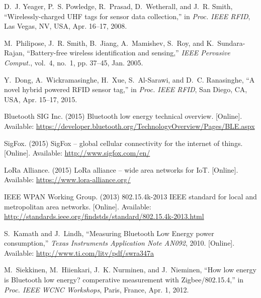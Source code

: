 \documentclass[conference,letterpaper,twoside,final,10pt]{IEEEtran}
\begin{document}
\begin{thebibliography}{10}
D.~J. {Yeager}, P.~S. {Powledge}, R.~{Prasad}, D.~{Wetherall}, and J.~R. Smith,
  ``Wirelessly-charged {UHF} tags for sensor data collection,'' in \emph{Proc.
  {IEEE} {RFID}}, Las Vegas, NV, USA, Apr. 16--17, 2008.

M.~{Philipose}, J.~R. {Smith}, B.~{Jiang}, A.~{Mamishev}, S.~{Roy}, and
  K.~{Sundara-Rajan}, ``Battery-free wireless identification and sensing,''
  \emph{{IEEE} Pervasive Comput.}, vol.~4, no.~1, pp. 37--45, Jan. 2005.

Y.~{Dong}, A.~{Wickramasinghe}, H.~{Xue}, S.~{Al-Sarawi}, and D.~C.
  {Ranasinghe}, ``A novel hybrid powered {RFID} sensor tag,'' in \emph{Proc.
  {IEEE} {RFID}}, San Diego, CA, USA, Apr. 15--17, 2015.

\BIBentryALTinterwordspacing
{Bluetooth SIG Inc.} (2015) Bluetooth low energy technical overview. [Online].
  Available:
  \url{https://developer.bluetooth.org/TechnologyOverview/Pages/BLE.aspx}
\BIBentrySTDinterwordspacing

\BIBentryALTinterwordspacing
{SigFox}. (2015) {SigFox} -- global cellular connectivity for the internet of
  things. [Online]. Available: \url{http://www.sigfox.com/en/}
\BIBentrySTDinterwordspacing

\BIBentryALTinterwordspacing
{LoRa Alliance}. (2015) {LoRa} alliance -- wide area networks for {IoT}.
  [Online]. Available: \url{https://www.lora-alliance.org/}
\BIBentrySTDinterwordspacing

\BIBentryALTinterwordspacing
{IEEE WPAN Working Group}. (2013) {802.15.4k-2013} {IEEE} standard for local
  and metropolitan area networks. [Online]. Available:
  \url{http://standards.ieee.org/findstds/standard/802.15.4k-2013.html}
\BIBentrySTDinterwordspacing

\BIBentryALTinterwordspacing
S.~{Kamath} and J.~{Lindh}, ``Measuring {Bluetooth Low Energy} power
  consumption,'' \emph{Texas Instruments Application Note {AN092}}, 2010.
  [Online]. Available: \url{http://www.ti.com/litv/pdf/swra347a}
\BIBentrySTDinterwordspacing

M.~{Siekkinen}, M.~{Hiienkari}, J.~K. {Nurminen}, and J.~{Nieminen}, ``How low
  energy is {Bluetooth} low energy? comperative measurement with
  {Zigbee}/{802.15.4},'' in \emph{Proc. {IEEE} {WCNC} Workshops}, Paris,
  France, Apr. 1, 2012.


\end{thebibliography}
\end{document}
